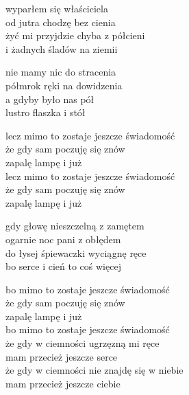 \begin{textn}
    \chordfill
    wyparłem się właściciela\\
    od jutra chodzę bez cienia\\
    żyć mi przyjdzie chyba z półcieni\\
    i żadnych śladów na ziemii

    nie mamy nic do stracenia\\
    półmrok ręki na dowidzenia\\
    a gdyby było nas pół\\
    lustro flaszka i stół

    \vin lecz mimo to zostaje jeszcze świadomość\\
    \vin że gdy sam poczuję się znów\\
    \vin zapalę lampę i już\\
    \vin lecz mimo to zostaje jeszcze świadomość\\
    \vin że gdy sam poczuję się znów\\
    \vin zapalę lampę i już

    gdy głowę nieszczelną z zamętem\\
    ogarnie noc pani z obłędem\\
    do łysej śpiewaczki wyciągnę ręce\\
    bo serce i cień to coś więcej

    \vin bo mimo to zostaje jeszcze świadomość\\
    \vin że gdy sam poczuję się znów\\
    \vin zapalę lampę i już\\
    \vin bo mimo to zostaje jeszcze świadomość\\
    \vin że gdy w ciemności ugrzęzną mi ręce\\
    \vin mam przecież jeszcze serce\\
    \vin że gdy w ciemności nie znajdę się w niebie\\
    \vin mam przecież jeszcze ciebie
\end{textn}
